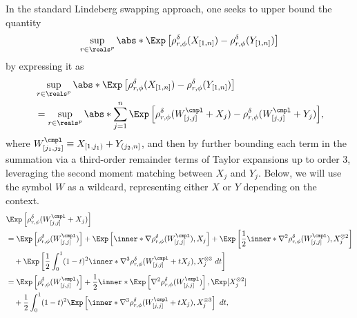 \documentclass[aos]{imsart}
\begin{document}
\medskip
{} 
In the standard Lindeberg swapping approach, one seeks to upper bound the quantity \begin{equation*}
    \sup_{r \in \reals^p} \abs*{ \Exp\left[\rho_{r,\phi}^\delta(X_{[1,n]}) - \rho_{r,\phi}^\delta(Y_{[1,n]})\right]}
\end{equation*}
by expressing it as
\begin{equation} \label{eq:first_lindeberg_swapping_N}
\begin{aligned}
    & \sup_{r \in \reals^p} \abs*{ \Exp\left[\rho_{r,\phi}^\delta(X_{[1,n]}) - \rho_{r,\phi}^\delta(Y_{[1,n]})\right]} \\
    & = \sup_{r \in \reals^p} \abs*{ \sum_{j=1}^{n} 
    \Exp \left[
        \rho_{r,\phi}^\delta(W^\cmpl_{[j,j]} + X_j)
        - \rho_{r,\phi}^\delta(W^\cmpl_{[j,j]} + Y_j)
    \right]},
\end{aligned}
\end{equation}
where $W_{[j_1,j_2]}^\cmpl \equiv X_{[1,j_1)} + Y_{(j_2,n]}$, and then by further bounding each term in the summation via a third-order remainder terms of Taylor expansions up to order $3$, leveraging the second moment matching between $X_j$ and $Y_j$. Below, we will use the symbol $W$ as a wildcard, representing either $X$ or $Y$ depending on the context. %
\begin{equation} \label{eq:lindeberg_swapping_indep}
\begin{aligned}
    & \Exp\left[\rho_{r,\phi}^\delta(W^\cmpl_{[j,j]} + X_j)\right] \\
    & = \Exp\left[\rho_{r,\phi}^\delta(W^\cmpl_{[j,j]})\right]
    + \Exp\left[ \inner*{ \nabla \rho_{r,\phi}^\delta(W^\cmpl_{[j,j]}), X_j} \right]
    + \Exp\left[ \frac{1}{2} \inner*{ 
    \nabla^2 \rho_{r,\phi}^\delta(W^\cmpl_{[j,j]}), X_j^{\otimes 2}} \right]  \\
    & \quad + \Exp\left[ \frac{1}{2} \int_0^1 (1-t)^2 \inner*{
    \nabla^3 \rho_{r,\phi}^\delta(W^\cmpl_{[j,j]} + t X_j), X_j^{\otimes 3}} ~dt \right] \\
    & = \Exp\left[ \rho_{r,\phi}^\delta(W^\cmpl_{[j,j]}) \right]
    + \frac{1}{2} \inner*{ 
    \Exp\left[ \nabla^2 \rho_{r,\phi}^\delta(W^\cmpl_{[j,j]}) \right], \Exp[ X_j^{\otimes 2} ]} \\
    & \quad + \frac{1}{2} \int_0^1 (1-t)^2 \Exp\left[ 
    \inner*{ \nabla^3 \rho_{r,\phi}^\delta(W^\cmpl_{[j,j]} + t X_j), X_j^{\otimes 3}} \right] ~dt,
\end{aligned}
\end{equation}
\end{document}
